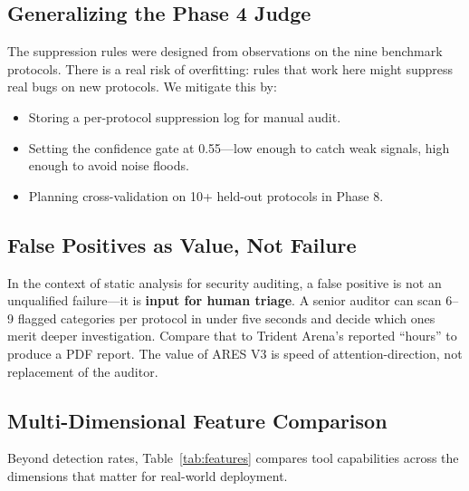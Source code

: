 \documentclass{article}
\begin{document}
\subsection{Generalizing the Phase 4 Judge}

The suppression rules were designed from observations on the nine benchmark protocols. There is a real risk of overfitting: rules that work here might suppress real bugs on new protocols. We mitigate this by:
\begin{itemize}
  \item Storing a per-protocol suppression log for manual audit.
  \item Setting the confidence gate at 0.55---low enough to catch weak signals, high enough to avoid noise floods.
  \item Planning cross-validation on 10+ held-out protocols in Phase 8.
\end{itemize}

\subsection{False Positives as Value, Not Failure}

In the context of static analysis for security auditing, a false positive is not an unqualified failure---it is \textbf{input for human triage}. A senior auditor can scan 6--9 flagged categories per protocol in under five seconds and decide which ones merit deeper investigation. Compare that to Trident Arena's reported ``hours'' to produce a PDF report. The value of ARES V3 is speed of attention-direction, not replacement of the auditor.

\subsection{Multi-Dimensional Feature Comparison}

Beyond detection rates, Table~\ref{tab:features} compares tool capabilities across the dimensions that matter for real-world deployment.
\end{document}
